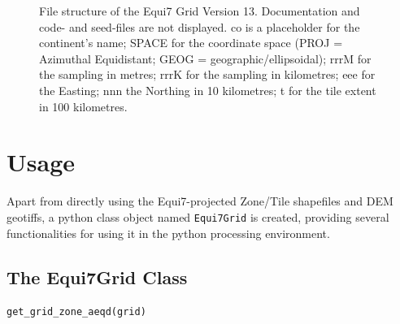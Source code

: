\documentclass[10pt,a4paper]{article}
\begin{document}
\begin{figure}
\centering
\noindent{}
\caption{
File structure of the Equi7 Grid Version 13. Documentation and code- and seed-files are not displayed. \textsf{co} is a placeholder for the continent's name; \textsf{SPACE} for the coordinate space (\textsf{PROJ} = Azimuthal Equidistant; \textsf{GEOG} = geographic/ellipsoidal); \textsf{rrrM} for the sampling in metres; \textsf{rrrK} for the sampling in kilometres; \textsf{eee} for the Easting; \textsf{nnn} the Northing in 10 kilometres; \textsf{t} for the tile extent in 100 kilometres.
}
\label{fig:equi7_v13_file_structure}
\end{figure}

\newpage

\section{Usage}
\label{sec:usage}

Apart from directly using the Equi7-projected Zone/Tile shapefiles and DEM geotiffs, a python class object named \texttt{Equi7Grid} is created, providing several functionalities for using it in the python processing environment.

\subsection{The Equi7Grid Class}

\verb#get_grid_zone_aeqd(grid)#
\end{document}
